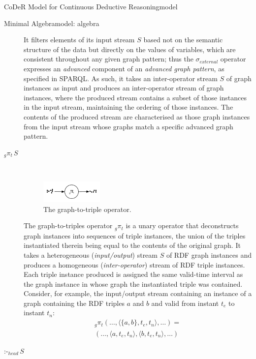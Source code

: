 \begin{nestedsection}{CoDeR Model for Continuous Deductive Reasoning}{model}
\begin{nestedsection}{Minimal Algebra}{model: algebra}
\begin{description}
				It filters elements of its input stream $S$ based not on the semantic structure of the data but directly on the values of variables, which are consistent throughout any given graph pattern;
				thus the $\sigma_{external}$ operator expresses an \emph{advanced} component of an \emph{advanced graph pattern}, as specified in SPARQL.
				As such, it takes an inter-operator stream $S$ of graph instances as input and produces an inter-operator stream of graph instances, where the produced stream contains a subset of those instances in the input stream, maintaining the ordering of those instances.
				The contents of the produced stream are characterised as those graph instances from the input stream whose graphs match a specific advanced graph pattern.
			\item[${{}_g{\pi_t}\,S}$] \hfill \\
				\begin{figure}[t]
					\centering
					\includegraphics[width=0.3\textwidth]{graph-to-triple}
					\caption{The graph-to-triple operator.}
				\end{figure}
				The graph-to-triples operator ${{}_g{\pi_t}}$ is a unary operator that deconstructs graph instances into sequences of triple instances, the union of the triples instantiated therein being equal to the contents of the original graph.
				It takes a heterogeneous (\emph{input/output}) stream $S$ of RDF graph instances and produces a homogeneous (\emph{inter-operator}) stream of RDF triple instances.
				Each triple instance produced is assigned the same valid-time interval as the graph instance in whose graph the instantiated triple was contained.
				Consider, for example, the input/output stream containing an instance of a graph containing the RDF triples $a$ and $b$ and valid from instant $t_e$ to instant $t_n$:
				\begin{multline*}
					{}_g{\pi_t} (\dots,\langle \{a,b\},t_e,t_n \rangle,\dots) = \\
						(\dots,\langle a,t_e,t_n \rangle,\langle b,t_e,t_n \rangle,\dots)
				\end{multline*}
			\item[$\text{:-}_{head}\,S$] \hfill \\
				\begin{figure}[b]
					\centering

\end{figure}
\end{description}
\end{nestedsection}
\end{nestedsection}
